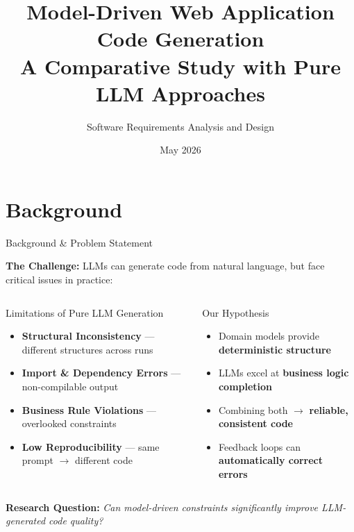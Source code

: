 \documentclass[10pt,aspectratio=169]{beamer}
\title{\textbf{Model-Driven Web Application Code Generation}\\A Comparative Study with Pure LLM Approaches}
\author{Software Requirements Analysis and Design}
\institute{Course Project --- Week 13 Presentation}
\date{May 2026}
\begin{document}
\begin{frame}[plain]
\maketitle
\end{frame}

\section{Background}
\begin{frame}{Background \& Problem Statement}
\vspace{-5pt}

\textbf{The Challenge:} LLMs can generate code from natural language, but face critical issues in practice:

\vspace{8pt}
\begin{columns}[T]
\begin{block}{Limitations of Pure LLM Generation}
\begin{itemize}
    \item \textbf{Structural Inconsistency} --- different structures across runs
    \item \textbf{Import \& Dependency Errors} --- non-compilable output
    \item \textbf{Business Rule Violations} --- overlooked constraints
    \item \textbf{Low Reproducibility} --- same prompt $\rightarrow$ different code
\end{itemize}
\end{block}

\begin{block}{Our Hypothesis}
\begin{itemize}
    \item Domain models provide \textbf{deterministic structure}
    \item LLMs excel at \textbf{business logic completion}
    \item Combining both $\rightarrow$ \textbf{reliable, consistent code}
    \item Feedback loops can \textbf{automatically correct errors}
\end{itemize}
\end{block}
\end{columns}

\vspace{10pt}
\begin{center}
\textbf{Research Question:} \textit{Can model-driven constraints significantly improve LLM-generated code quality?}
\end{center}

\end{frame}
\end{document}
